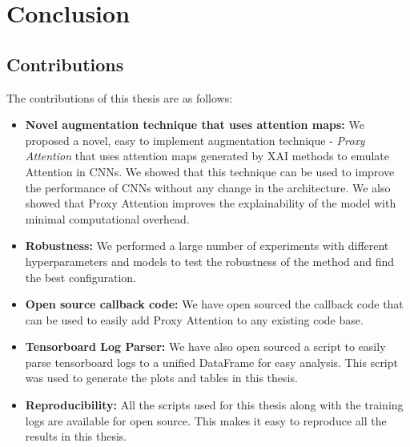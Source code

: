 \chapter{Conclusion} \label{ch:conclusion}
\section{Contributions}
The contributions of this thesis are as follows:
\begin{itemize}
    \item \textbf{Novel augmentation technique that uses attention maps: } We proposed a novel, easy to implement augmentation technique - \textit{Proxy Attention} that uses attention maps generated by XAI methods to emulate Attention in CNNs. We showed that this technique can be used to improve the performance of CNNs without any change in the architecture. We also showed that Proxy Attention improves the explainability of the model with minimal computational overhead.
    \item \textbf{Robustness: } We performed a large number of experiments with different hyperparameters and models to test the robustness of the method and find the best configuration. 
    \item \textbf{Open source callback code: } We have open sourced the callback code that can be used to easily add Proxy Attention to any existing code base.
    \item \textbf{Tensorboard Log Parser: } We have also open sourced a script to easily parse tensorboard logs to a unified DataFrame for easy analysis. This script was used to generate the plots and tables in this thesis.
    \item \textbf{Reproducibility: } All the scripts used for this thesis along with the training logs are available for open source. This makes it easy to reproduce all the results in this thesis.
\end{itemize}

